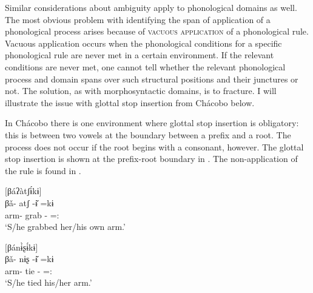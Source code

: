 \documentclass[output=paper,hidelinks]{langscibook}
\begin{document}

Similar considerations about ambiguity apply to phonological domains as well. The most obvious problem with identifying the span of application of a phonological process arises because of \textsc{vacuous application} of a phonological rule. Vacuous application occurs when the phonological conditions for a specific phonological rule are never met in a certain environment. If the relevant conditions are never met, one cannot tell whether the relevant phonological process and domain spans over such structural positions and their junctures or not. The solution, as with morphosyntactic domains, is to fracture. I will illustrate the issue with glottal stop insertion from Chácobo below.

In Chácobo there is one environment where glottal stop insertion is obligatory: this is between two vowels at the boundary between a prefix and a root. The process does not occur if the root begins with a consonant, however. The glottal stop insertion is shown at the prefix-root boundary in . The non-application of the rule is found in .


\ea \label{ex:chacobobodypartprefix1}
    $[$βáʔàtʃɨ́kɨ$]$ \\
    \gll βǎ- atʃ -ɨ̌ =kɨ \\
    arm- grab -\Itr{}{} =\Decl{}:\Pst{} \\
    \glt `S/he grabbed her/his own arm.'
\z 

\ea \label{ex:chacobobodypartprefix2}
    $[$βánɨ̀ʂɨ́kɨ$]$ \\
    \gll βǎ- nɨʂ -ɨ̌   =kɨ \\
    arm- tie -\Itr{} =\Decl{}:\Pst{} \\
    \glt `S/he tied his/her arm.'
\z 
\end{document}

